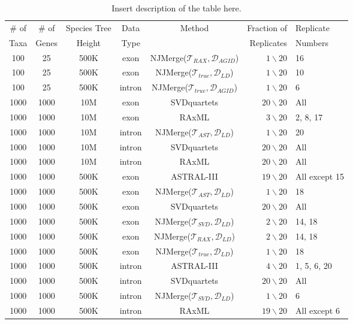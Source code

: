 \documentclass{article}
\begin{document}
\begin{table}[h!]
\begin{center}
\caption{Insert description of the table here.}
\begin{tabular}{cccccrl}
\toprule
\# of     & \# of     & Species Tree  & Data  & Method    & Fraction of   & Replicate\\
Taxa      & Genes     & Height        & Type  &           & Replicates    & Numbers\\
\midrule
100 & 25 & 500K & exon & NJMerge($\mathcal{T}_{RAX}, \mathcal{D}_{AGID}$) & $1\backslash20$ & 16\\
100 & 25 & 500K & exon & NJMerge($\mathcal{T}_{true}, \mathcal{D}_{LD}$) & $1\backslash20$ & 10\\
100 & 25 & 500K & intron & NJMerge($\mathcal{T}_{true}, \mathcal{D}_{AGID}$) & $1\backslash20$ & 6\\
1000 & 1000 & 10M & exon & SVDquartets & $20\backslash20$ & All\\
1000 & 1000 & 10M & exon & RAxML & $3\backslash20$ & 2, 8, 17\\
1000 & 1000 & 10M & intron & NJMerge($\mathcal{T}_{AST}, \mathcal{D}_{LD}$) & $1\backslash20$ & 20\\
1000 & 1000 & 10M & intron & SVDquartets & $20\backslash20$ & All\\
1000 & 1000 & 10M & intron & RAxML & $20\backslash20$ & All\\
1000 & 1000 & 500K & exon & ASTRAL-III & $19\backslash20$ & All except 15\\
1000 & 1000 & 500K & exon & NJMerge($\mathcal{T}_{AST}, \mathcal{D}_{LD}$) & $1\backslash20$ & 18\\
1000 & 1000 & 500K & exon & SVDquartets & $20\backslash20$ & All\\
1000 & 1000 & 500K & exon & NJMerge($\mathcal{T}_{SVD}, \mathcal{D}_{LD}$) & $2\backslash20$ & 14, 18\\
1000 & 1000 & 500K & exon & NJMerge($\mathcal{T}_{RAX}, \mathcal{D}_{LD}$) & $2\backslash20$ & 14, 18\\
1000 & 1000 & 500K & exon & NJMerge($\mathcal{T}_{true}, \mathcal{D}_{LD}$) & $1\backslash20$ & 18\\
1000 & 1000 & 500K & intron & ASTRAL-III & $4\backslash20$ & 1, 5, 6, 20\\
1000 & 1000 & 500K & intron & SVDquartets & $20\backslash20$ & All\\
1000 & 1000 & 500K & intron & NJMerge($\mathcal{T}_{SVD}, \mathcal{D}_{LD}$) & $1\backslash20$ & 6\\
1000 & 1000 & 500K & intron & RAxML & $19\backslash20$ & All except 6\\
\bottomrule
\end{tabular}
\end{center}
\end{table}
\end{document}
